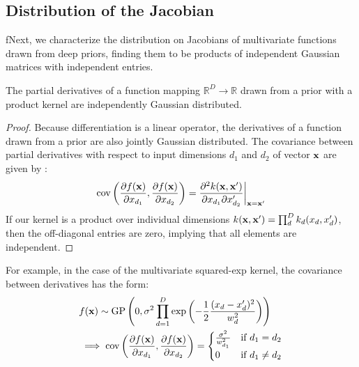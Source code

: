 \subsection{Distribution of the Jacobian}
\label{sec:theorem}
fNext, we characterize the distribution on Jacobians of multivariate functions drawn from deep \gp{} priors, finding them to be products of independent Gaussian matrices with independent entries.

\begin{lemma}
\label{thm:deriv-ind}
The partial derivatives of a function mapping $\mathbb{R}^D \rightarrow \mathbb{R}$ drawn from a \gp{} prior with a product kernel are independently Gaussian distributed.
\end{lemma}
%
\begin{proof}
Because differentiation is a linear operator, the derivatives of a function drawn from a \gp{} prior are also jointly Gaussian distributed.
The covariance between partial derivatives with respect to input dimensions $d_1$ and $d_2$ of vector ${\bf{x}}$ are given by \citet{Solak03derivativeobservations}:
%
\begin{align}
\operatorname{cov} \left( \frac{\partial f({\bf{x}})}{\partial x_{d_1}}, \frac{\partial f({\bf{x}})}{\partial x_{d_2}} \right) 
= \frac{\partial^2 k({\bf{x}}, {\bf{x}}')}{\partial x_{d_1} \partial x_{d_2}'} \bigg|_{{\bf{x}}={\bf{x}}'}
\label{eq:deriv-kernel}
\end{align}
%
If our kernel is a product over individual dimensions $k({\bf{x}}, {\bf{x}}') = \prod_d^D k_d(x_d, x_d')$, 
then the off-diagonal entries are zero, implying that all elements are independent.
\end{proof}

For example, in the case of the multivariate squared-exp kernel, the covariance between derivatives has the form:
%
\begin{align}
& f({\bf{x}}) \sim \textnormal{GP}\left( 0, 
\sigma^2 \prod_{d=1}^D \exp \left(-\frac{1}{2} \frac{(x_d - x_d')^2}{w_d^2} \right) \right) \nonumber \\
& \implies 
\operatorname{cov} \left( \frac{\partial f({\bf{x}})}{\partial x_{d_1}}, \frac{\partial f({\bf{x}})}{\partial x_{d_2}} \right) =
\begin{cases} 
\frac{\sigma^2}{w_{d_1}^2} & \mbox{if } d_1 = d_2 \\ 
0 & \mbox{if } d_1 \neq d_2 \end{cases}
\end{align}



